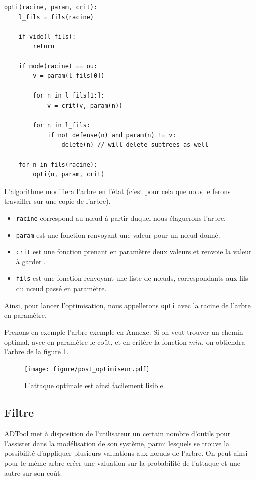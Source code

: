 		\begin{lstlisting}
opti(racine, param, crit):
	l_fils = fils(racine)

	if vide(l_fils):
		return

	if mode(racine) == ou:
		v = param(l_fils[0])

		for n in l_fils[1:]:
			v = crit(v, param(n))

		for n in l_fils:
			if not defense(n) and param(n) != v:
				delete(n) // will delete subtrees as well
	
	for n in fils(racine):
		opti(n, param, crit)
		\end{lstlisting}

		L'algorithme modifiera l'arbre en l'état (c'est pour cela que nous le ferons travailler sur une copie de l'arbre).
		\begin{itemize}
			\item \verb|racine| correspond au nœud à partir duquel nous élaguerons l'arbre.
			\item \verb|param| est une fonction renvoyant une valeur pour un nœud donné.
			\item \verb|crit| est une fonction prenant en paramètre deux valeurs et renvoie la valeur à \og garder \fg.
			\item \verb|fils| est une fonction renvoyant une liste de nœuds, correspondants aux fils du nœud passé en paramètre.
		\end{itemize}
		Ainsi, pour lancer l'optimisation, nous appellerons \verb|opti| avec la racine de l'arbre en paramètre.

		Prenons en exemple l'arbre exemple en Annexe. %
		Si on veut trouver un chemin optimal, avec en paramètre le coût, et en critère la fonction $min$, on obtiendra l'arbre de la figure \ref{fig:arbre_post_opti}.

		\begin{figure}[h!]
			\centering
			\texttt{[image: figure/post\_optimiseur.pdf]}
			\caption{L'attaque optimale est ainsi facilement lisible.}
			\label{fig:arbre_post_opti}
		\end{figure}


	\subsection{Filtre}
	\label{subsection:filtre} 
	
		ADTool met à disposition de l'utilisateur un certain nombre d'outils pour l'assister dans la modélisation de son système, parmi lesquels se trouve la possibilité d'appliquer plusieurs valuations aux nœuds de l'arbre. On peut ainsi pour le même arbre créer une valuation sur la probabilité de l'attaque et une autre sur son coût.

